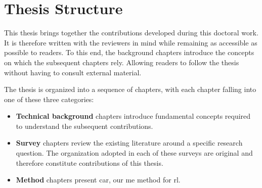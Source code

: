 \section{Thesis Structure}
\label{sec:manuscript_structure}



This thesis brings together the contributions developed during this doctoral work.
It is therefore written with the reviewers in mind while remaining as accessible as possible to readers.
To this end, the background chapters introduce the concepts on which the subsequent chapters rely.
Allowing readers to follow the thesis without having to consult external material.

The thesis is organized into a sequence of chapters, with each chapter falling into one of these three categories:
\begin{itemize}
\item[] \textcolor{myblue}{\textbf{Technical background}} chapters introduce fundamental concepts required to understand the subsequent contributions.
\item[] \textcolor{mygreen}{\textbf{Survey}} chapters review the existing literature around a specific research question.
The organization adopted in each of these surveys are original and therefore constitute contributions of this thesis.
\item[] \textcolor{myred}{\textbf{Method}} chapters present \gls{car}, our \gls{me} method for \gls{rl}.
\end{itemize}

